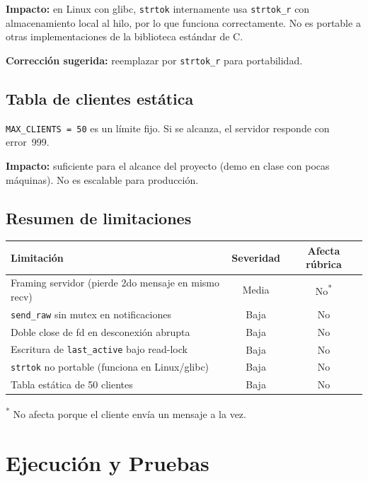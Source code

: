 \documentclass[12pt,a4paper]{article}
\begin{document}
\textbf{Impacto:} en Linux con glibc, \texttt{strtok} internamente usa
\texttt{strtok\_r} con almacenamiento local al hilo, por lo que funciona
correctamente.  No es portable a otras implementaciones de la biblioteca estándar de
C.

\textbf{Corrección sugerida:} reemplazar por \texttt{strtok\_r} para portabilidad.

\subsection{Tabla de clientes estática}

\texttt{MAX\_CLIENTS = 50} es un límite fijo.  Si se alcanza, el servidor responde
con error~999.

\textbf{Impacto:} suficiente para el alcance del proyecto (demo en clase con pocas
máquinas).  No es escalable para producción.

\subsection{Resumen de limitaciones}

\begin{center}
\begin{tabular}{lcc}
\toprule
\textbf{Limitación} & \textbf{Severidad} & \textbf{Afecta rúbrica} \\
\midrule
Framing servidor (pierde 2do mensaje en mismo recv) & Media & No\textsuperscript{*} \\
\texttt{send\_raw} sin mutex en notificaciones      & Baja  & No \\
Doble close de fd en desconexión abrupta             & Baja  & No \\
Escritura de \texttt{last\_active} bajo read-lock    & Baja  & No \\
\texttt{strtok} no portable (funciona en Linux/glibc) & Baja & No \\
Tabla estática de 50 clientes                        & Baja  & No \\
\bottomrule
\end{tabular}
\end{center}

\textsuperscript{*} No afecta porque el cliente envía un mensaje a la vez.

\section{Ejecución y Pruebas}
\end{document}
